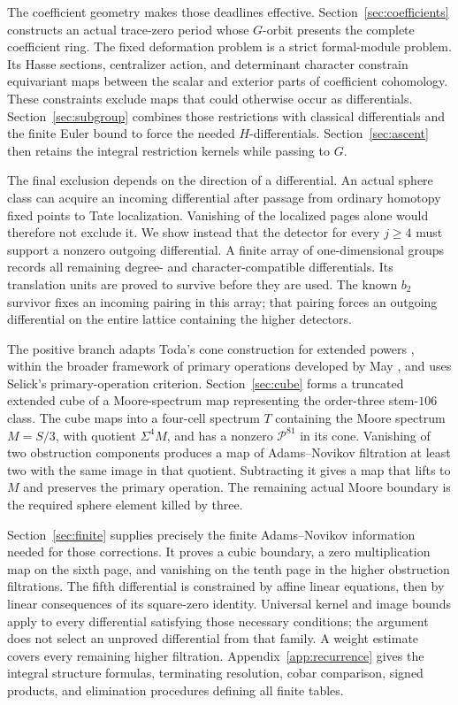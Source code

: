The coefficient geometry makes those deadlines effective. Section~\ref{sec:coefficients} constructs an actual trace-zero period whose $G$-orbit presents the complete coefficient ring. The fixed deformation problem is a strict formal-module problem. Its Hasse sections, centralizer action, and determinant character constrain equivariant maps between the scalar and exterior parts of coefficient cohomology. These constraints exclude maps that could otherwise occur as differentials. Section~\ref{sec:subgroup} combines those restrictions with classical differentials and the finite Euler bound to force the needed $H$-differentials. Section~\ref{sec:ascent} then retains the integral restriction kernels while passing to $G$.

The final exclusion depends on the direction of a differential. An actual sphere class can acquire an incoming differential after passage from ordinary homotopy fixed points to Tate localization. Vanishing of the localized pages alone would therefore not exclude it. We show instead that the detector for every $j\geq4$ must support a nonzero outgoing differential. A finite array of one-dimensional groups records all remaining degree- and character-compatible differentials. Its translation units are proved to survive before they are used. The known $b_2$ survivor fixes an incoming pairing in this array; that pairing forces an outgoing differential on the entire lattice containing the higher detectors.

The positive branch adapts Toda's cone construction for extended powers \cite[Section~1, Theorem~2]{TodaExtended}, within the broader framework of primary operations developed by May \cite[Sections~2--3]{MayOperations}, and uses Selick's primary-operation criterion. Section~\ref{sec:cube} forms a truncated extended cube of a Moore-spectrum map representing the order-three stem-$106$ class. The cube maps into a four-cell spectrum $T$ containing the Moore spectrum $M=S/3$, with quotient $\Sigma^4M$, and has a nonzero $\mathcal P^{81}$ in its cone. Vanishing of two obstruction components produces a map of Adams--Novikov filtration at least two with the same image in that quotient. Subtracting it gives a map that lifts to $M$ and preserves the primary operation. The remaining actual Moore boundary is the required sphere element killed by three.

Section~\ref{sec:finite} supplies precisely the finite Adams--Novikov information needed for those corrections. It proves a cubic boundary, a zero multiplication map on the sixth page, and vanishing on the tenth page in the higher obstruction filtrations. The fifth differential is constrained by affine linear equations, then by linear consequences of its square-zero identity. Universal kernel and image bounds apply to every differential satisfying those necessary conditions; the argument does not select an unproved differential from that family. A weight estimate covers every remaining higher filtration. Appendix~\ref{app:recurrence} gives the integral structure formulas, terminating resolution, cobar comparison, signed products, and elimination procedures defining all finite tables.

